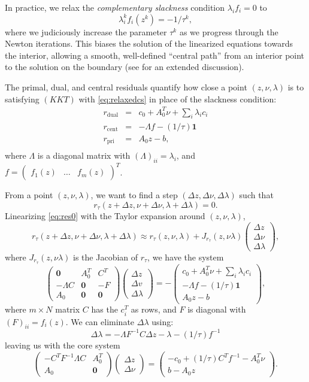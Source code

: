 \documentclass{article}
\newcommand{\bpm}{\left(\begin{matrix}}
\newcommand{\epm}{\end{matrix}\right)}
\newcommand{\dv}{\Delta v}
\newcommand{\dz}{\Delta z}
\newcommand{\dlam}{\Delta\lambda}
\newcommand{\dnu}{\Delta\nu}
\newcommand{\<}{\langle}
\renewcommand{\>}{\rangle}
\begin{document}
In practice, we relax the {\em complementary slackness} condition $\lambda_i f_i = 0$ to 
\begin{equation}
\label{eq:relaxedcs}
\lambda^k_i f_i(z^k) = -1/\tau^k,
\end{equation}
where we judiciously increase the parameter $\tau^k$ as we progress through the Newton iterations.  This biases the solution of the linearized equations towards the interior, allowing a smooth, well-defined ``central path'' from an interior point to the solution on the boundary (see 
\cite{nocedal99nu,wright97pr} for an extended discussion).

The primal, dual, and central residuals quantify how close a point $(z,\nu,\lambda)$ is to satisfying $(KKT)$ with \eqref{eq:relaxedcs} in place of the slackness condition:
\begin{eqnarray*}
r_{\mathrm{dual}} & = & c_0 + A_0^T\nu + \sum_i \lambda_i c_i \\
r_{\mathrm{cent}} & = & -\Lambda f - (1/\tau)\mathbf{1} \\
r_{\mathrm{pri}} & = & A_0 z-b,\\
\end{eqnarray*}
where $\Lambda$ is a diagonal matrix with $(\Lambda)_{ii} = \lambda_i$, and 
$f = \bpm f_1(z) & \ldots & f_m(z) \epm^T$.

From a point $(z,\nu,\lambda)$, we want to find a step $(\dz,\dnu,\dlam)$ such that
\begin{equation}
\label{eq:res0}
r_\tau(z+\dz,\nu+\dnu,\lambda+\dlam) = 0.
\end{equation}
Linearizing \eqref{eq:res0} with the Taylor expansion around $(z,\nu,\lambda)$,
\[
r_\tau(z+\dz,\nu+\dnu,\lambda+\dlam) \approx 
r_\tau(z,\nu,\lambda) +  J_{r_\tau}(z,\nu\lambda)
\bpm \dz \\ \dnu \\ \dlam \epm,
\]
where $J_{r_\tau}(z,\nu\lambda)$ is the Jacobian of $r_\tau$, we have the system
\[
\bpm \mathbf{0} & A_0^T & C^T \\
-\Lambda C & \mathbf{0} & -F \\
A_0 & \mathbf{0} & \mathbf{0} 
\epm
\bpm \dz \\ \dv \\ \dlam \epm = 
- \bpm
c_0 + A_0^T\nu + \sum_i \lambda_i c_i  \\
-\Lambda f - (1/\tau)\mathbf{1} \\
A_0 z-b
\epm,
\]
where $m\times N$ matrix $C$ has the $c^T_i$ as rows, and $F$ is diagonal with 
$(F)_{ii} = f_i(z)$.
We can eliminate $\dlam$ using:
\begin{equation}
\label{eq:dlambda}
\dlam = -\Lambda F^{-1}C\dz - \lambda - (1/\tau)f^{-1}
\end{equation}
leaving us with the core system
\begin{equation}
\label{eq:pdnewton}
\bpm -C^TF^{-1}\Lambda C & A_0^T \\ A_0 & \mathbf{0} \epm \bpm \dz \\ \dnu \epm = 
\bpm -c_0 + (1/\tau)C^Tf^{-1} - A_0^T\nu
\\ b-A_0 z \epm.
\end{equation}
\end{document}
